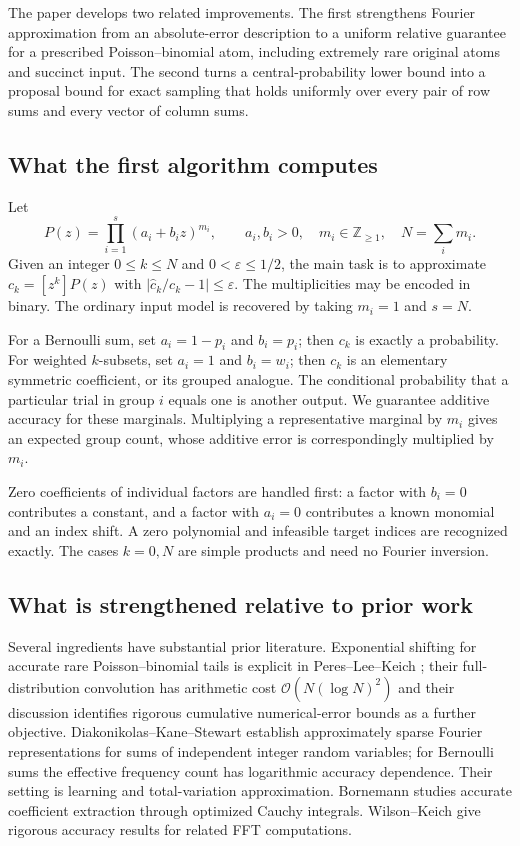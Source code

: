 \documentclass[11pt,a4paper]{article}
\theoremstyle{definition}
\newcommand{\Z}{\mathbb Z}
\newcommand{\abs}[1]{\left|#1\right|}
\newcommand{\BigO}{\mathcal O}
\begin{document}
The paper develops two related improvements. The first strengthens Fourier approximation from an absolute-error description to a uniform relative guarantee for a prescribed Poisson--binomial atom, including extremely rare original atoms and succinct input. The second turns a central-probability lower bound into a proposal bound for exact sampling that holds uniformly over every pair of row sums and every vector of column sums.

\subsection{What the first algorithm computes}

Let
\begin{equation}\label{eq:polynomial}
 P(z)=\prod_{i=1}^{s}(a_i+b_i z)^{m_i},\qquad
 a_i,b_i>0,\quad m_i\in\Z_{\ge1},\quad N=\sum_i m_i.
\end{equation}
Given an integer $0\le k\le N$ and $0<\varepsilon\le1/2$, the main task is to approximate
$c_k=[z^k]P(z)$ with $\abs{\widehat c_k/c_k-1}\le\varepsilon$.
The multiplicities may be encoded in binary. The ordinary input model is recovered by taking $m_i=1$ and $s=N$.

For a Bernoulli sum, set $a_i=1-p_i$ and $b_i=p_i$; then $c_k$ is exactly a probability. For weighted $k$-subsets, set $a_i=1$ and $b_i=w_i$; then $c_k$ is an elementary symmetric coefficient, or its grouped analogue. The conditional probability that a particular trial in group $i$ equals one is another output. We guarantee additive accuracy for these marginals. Multiplying a representative marginal by $m_i$ gives an expected group count, whose additive error is correspondingly multiplied by $m_i$.

Zero coefficients of individual factors are handled first: a factor with $b_i=0$ contributes a constant, and a factor with $a_i=0$ contributes a known monomial and an index shift. A zero polynomial and infeasible target indices are recognized exactly. The cases $k=0,N$ are simple products and need no Fourier inversion.

\subsection{What is strengthened relative to prior work}

Several ingredients have substantial prior literature. Exponential shifting for accurate rare Poisson--binomial tails is explicit in Peres--Lee--Keich \cite{plk}; their full-distribution convolution has arithmetic cost $\BigO(N(\log N)^2)$ and their discussion identifies rigorous cumulative numerical-error bounds as a further objective. Diakonikolas--Kane--Stewart \cite{dks} establish approximately sparse Fourier representations for sums of independent integer random variables; for Bernoulli sums the effective frequency count has logarithmic accuracy dependence. Their setting is learning and total-variation approximation. Bornemann \cite{bornemann} studies accurate coefficient extraction through optimized Cauchy integrals. Wilson--Keich \cite{wk2017,wk2016} give rigorous accuracy results for related FFT computations.
\end{document}
